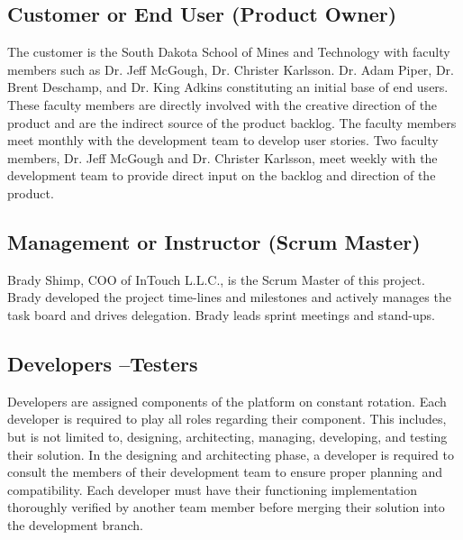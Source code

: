 \subsection{Customer or End User (Product Owner)}

The customer is the South Dakota School of Mines and Technology with faculty members such as Dr. Jeff McGough, Dr. Christer Karlsson. Dr. Adam Piper, Dr. Brent Deschamp, and Dr. King Adkins constituting an initial base of end users. These faculty members are directly involved with the creative direction of the product and are the indirect source of the product backlog. The faculty members meet monthly with the development team to develop user stories. Two faculty members, Dr. Jeff McGough and Dr. Christer Karlsson, meet weekly with the development team to provide direct input on the backlog and direction of the product. 

\subsection{Management or Instructor (Scrum Master)}

Brady Shimp, COO of InTouch L.L.C., is the Scrum Master of this project. Brady developed the project time-lines and milestones and actively manages the task board and drives delegation. Brady leads sprint meetings and stand-ups. 

\subsection{Developers --Testers}

Developers are assigned components of the platform on constant rotation. Each developer is required to play all roles regarding their component. This includes, but is not limited to, designing, architecting, managing, developing, and testing their solution. In the designing and architecting phase, a developer is required to consult the members of their development team to ensure proper planning and compatibility. Each developer must have their functioning implementation thoroughly verified by another team member before merging their solution into the development branch. 

